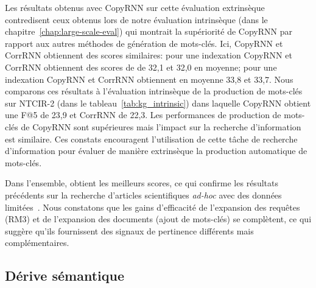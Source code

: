 Les résultats obtenus avec CopyRNN sur cette évaluation extrinsèque contredisent ceux obtenus lors de notre évaluation intrinsèque (dans le chapitre~\ref{chap:large-scale-eval}) qui montrait la supériorité de CopyRNN par rapport aux autres méthodes de génération de mots-clés.
Ici, CopyRNN et CorrRNN obtiennent des scores similaires: pour une indexation \tr{} CopyRNN et CorrRNN obtiennent des scores de \map{} de 32,1 et 32,0 en moyenne; pour une indexation \trm{} CopyRNN et CorrRNN obtiennent en moyenne 33,8 et 33,7.
Nous comparons ces résultats à l'évaluation intrinsèque de la production de mots-clés sur NTCIR-2 (dans le tableau~\ref{tab:kg_intrinsic}) dans laquelle CopyRNN obtient une F@5 de 23,9 et CorrRNN de 22,3.
Les performances de production de mots-clés de CopyRNN sont supérieures mais l'impact sur la recherche d'information est similaire.
Ces constats encouragent l'utilisation de cette tâche de recherche d'information pour évaluer de manière extrinsèque la production automatique de mots-clés.




Dans l'ensemble, \bmrm{} obtient les meilleurs scores, ce qui confirme les résultats précédents sur la recherche d'articles scientifiques \textit{ad-hoc} avec des données limitées~\cite{lin_neural_2019}.
Nous constatons que les gains d'efficacité de l'expansion des requêtes (RM3) et de l'expansion des documents (ajout de mots-clés) se complètent, ce qui suggère qu'ils fournissent des signaux de pertinence différents mais complémentaires.

\subsection{Dérive sémantique}\label{sec:derive_semantique}



